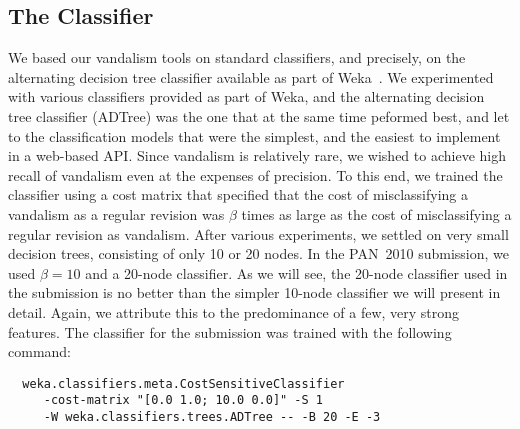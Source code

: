\subsection{The Classifier}

We based our vandalism tools on standard classifiers, and precisely, on the alternating decision tree classifier available as part of Weka~\cite{Weka09}.  
We experimented with various classifiers provided as part of Weka, and the alternating decision tree classifier (ADTree) was the one that at the same time peformed best, and let to the classification models that were the simplest, and the easiest to implement in a web-based API. 
Since vandalism is relatively rare, we wished to achieve high recall of vandalism even at the expenses of precision. 
To this end, we trained the classifier using a cost matrix that specified that the cost of misclassifying a vandalism as a regular revision was $\beta$ times as large as the cost of misclassifying a regular revision as vandalism.  
After various experiments, we settled on very small decision trees, consisting of only 10 or 20 nodes. 
In the PAN~2010 submission, we used $\beta=10$ and a 20-node classifier. 
As we will see, the 20-node classifier used in the submission is no better than the simpler 10-node classifier we will present in detail.
Again, we attribute this to the predominance of a few, very strong features. 
The classifier for the submission was trained with the following command:
%
{\small
\begin{verbatim}
  weka.classifiers.meta.CostSensitiveClassifier 
     -cost-matrix "[0.0 1.0; 10.0 0.0]" -S 1 
     -W weka.classifiers.trees.ADTree -- -B 20 -E -3
\end{verbatim}
}

